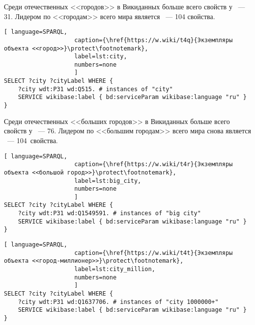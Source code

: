 Среди отечественных <<городов>> в Викиданных больше всего свойств 
у ~--- 31. %
Лидером по <<городам>> всего мира является ~--- 104 свойства.

\begin{lstlisting}[ language=SPARQL, 
                    caption={\href{https://w.wiki/t4q}{Экземпляры объекта <<город>>}\protect\footnotemark},
                    label=lst:city,
                    numbers=none
                    ]
SELECT ?city ?cityLabel WHERE {
	?city wdt:P31 wd:Q515. # instances of "city"
	SERVICE wikibase:label { bd:serviceParam wikibase:language "ru" }
}
\end{lstlisting}

Среди отечественных <<больших городов>> в Викиданных больше всего свойств 
у ~--- 76. %
Лидером по <<большим городам>> всего мира снова является ~--- 104~свойства.

\begin{lstlisting}[ language=SPARQL, 
                    caption={\href{https://w.wiki/t4r}{Экземпляры объекта <<большой город>>}\protect\footnotemark},
                    label=lst:big_city,
                    numbers=none
                    ]
SELECT ?city ?cityLabel WHERE {
	?city wdt:P31 wd:Q1549591. # instances of "big city"    
	SERVICE wikibase:label { bd:serviceParam wikibase:language "ru" }
}
\end{lstlisting}




\newpage
\begin{lstlisting}[ language=SPARQL, 
                    caption={\href{https://w.wiki/t4t}{Экземпляры объекта <<город-миллионер>>}\protect\footnotemark},
                    label=lst:city_million,
                    numbers=none
                    ]
SELECT ?city ?cityLabel WHERE {
	?city wdt:P31 wd:Q1637706. # instances of "city 1000000+" 
	SERVICE wikibase:label { bd:serviceParam wikibase:language "ru" }
}
\end{lstlisting}


